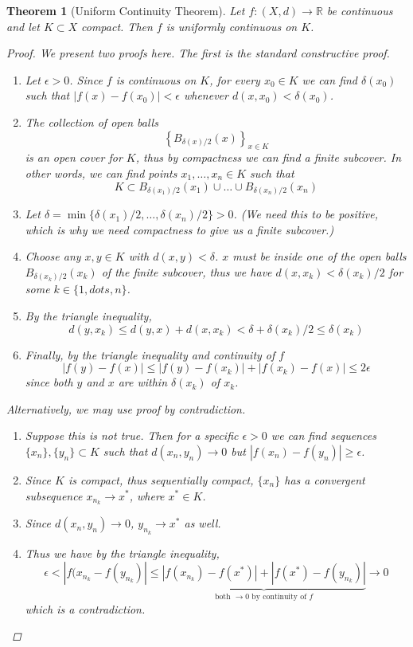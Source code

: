 \documentclass[10pt]{article}         %
\newtheorem{theorem}{Theorem}[section]
\theoremstyle{remark}
\newcommand{\R}{\mathbb{R}}
\begin{document}
\begin{theorem}[Uniform Continuity Theorem]
Let $f: (X, d) \rightarrow \R$ be continuous and let $K \subset X$ compact. Then $f$ is uniformly continuous on $K$.
\begin{proof}
We present two proofs here. The first is the standard constructive proof.
\begin{enumerate}
    \item Let $\epsilon > 0$. Since $f$ is continuous on $K$, for every $x_0 \in K$ we can find $\delta(x_0)$ such that $|f(x) - f(x_0)| < \epsilon$ whenever $d(x, x_0) < \delta(x_0)$.
    \item The collection of open balls 
    \[
    \left\{ B_{\delta(x)/2}(x) \right\}_{x \in K}
    \]
    is an open cover for $K$, thus by compactness we can find a finite subcover. In other words, we can find points $x_1, \dots, x_n \in K$ such that
    \[
    K \subset B_{\delta(x_1)/2}(x_1) \cup \dots \cup B_{\delta(x_n)/2}(x_n)
    \]
    \item Let $\delta = \min\{ \delta(x_1)/2, \dots, \delta(x_n)/2 \} > 0$. (We need this to be positive, which is why we need compactness to give us a finite subcover.)
    \item Choose any $x, y \in K$ with $d(x, y) < \delta$. $x$ must be inside one of the open balls $B_{\delta(x_k)/2}(x_k)$ of the finite subcover, thus we have $d(x, x_k) < \delta(x_k)/2$ for some $k \in \{1, dots, n\}$.
    \item By the triangle inequality,
    \[
    d(y, x_k) \leq d(y, x) + d(x, x_k) < \delta + \delta(x_k)/2 \leq \delta(x_k)
    \]
    \item Finally, by the triangle inequality and continuity of $f$
    \[
    |f(y) - f(x)| \leq |f(y) - f(x_k)| + |f(x_k) - f(x)|
    \leq 2 \epsilon
    \]
    since both $y$ and $x$ are within $\delta(x_k)$ of $x_k$.
\end{enumerate}
Alternatively, we may use proof by contradiction.
\begin{enumerate}
    \item Suppose this is not true. Then for a specific $\epsilon > 0$ we can find sequences $\{x_n\}, \{y_n\} \subset K$ such that $d(x_n, y_n) \rightarrow 0$ but $|f(x_n) - f(y_n)| \geq \epsilon$.
    \item Since $K$ is compact, thus sequentially compact, $\{x_n\}$ has a convergent subsequence $x_{n_k} \rightarrow x^*$, where $x^* \in K$.
    \item Since $d(x_n, y_n) \rightarrow 0$, $y_{n_k} \rightarrow x^*$ as well.
    \item Thus we have by the triangle inequality,
    \[
    \epsilon < |f(x_{n_k} - f(y_{n_k})|
    \leq \underbrace{|f(x_{n_k}) - f(x^*)| + |f(x^*) - f(y_{n_k})|}_{\text{both  }\rightarrow 0\text{ by continuity of }f} \rightarrow 0
    \]
    which is a contradiction.
\end{enumerate}
\end{proof}
\end{theorem}
\end{document}
